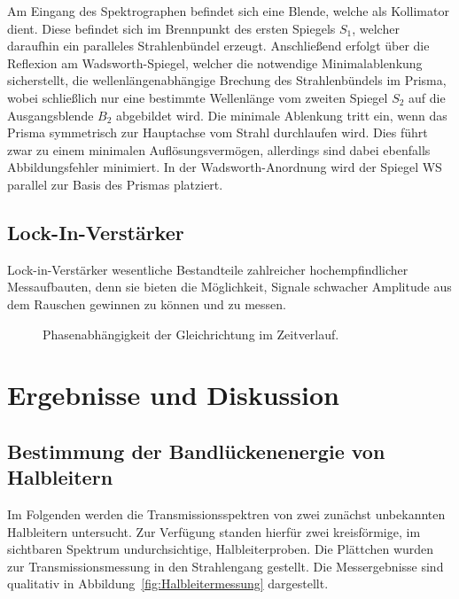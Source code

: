 \documentclass[a4paper,twoside,final]{article}
\begin{document}
Am Eingang des Spektrographen befindet sich eine Blende, welche als Kollimator dient. Diese befindet sich im Brennpunkt des ersten Spiegels $S_1$, welcher daraufhin ein paralleles Strahlenbündel erzeugt. Anschließend erfolgt über die Reflexion am Wadsworth-Spiegel, welcher die notwendige Minimalablenkung sicherstellt, die wellenlängenabhängige Brechung des Strahlenbündels im Prisma, wobei schließlich nur eine bestimmte Wellenlänge vom zweiten Spiegel $S_2$ auf die Ausgangsblende $B_2$ abgebildet wird. Die minimale Ablenkung tritt ein, wenn das Prisma symmetrisch zur Hauptachse vom Strahl durchlaufen wird. Dies führt zwar zu einem minimalen Auflösungsvermögen, allerdings sind dabei ebenfalls Abbildungsfehler minimiert. In der Wadsworth-Anordnung wird der Spiegel WS parallel zur Basis des Prismas platziert.

\subsection{Lock-In-Verstärker}
Lock-in-Verstärker wesentliche Bestandteile zahlreicher hochempfindlicher Messaufbauten, denn sie bieten die Möglichkeit, Signale schwacher Amplitude aus dem Rauschen gewinnen zu können und zu messen.
\begin{figure}[ht]
    \centering
    
    \caption{Phasenabhängigkeit der Gleichrichtung im Zeitverlauf.}
    \label{fig:Gleichrichtung}
\end{figure}

\newpage
\section{Ergebnisse und Diskussion}\label{sec:ErgebnisseUndDiskussion}
% 

\subsection{Bestimmung der Bandlückenenergie von Halbleitern}

Im Folgenden werden die Transmissionsspektren von zwei zunächst unbekannten Halbleitern untersucht. Zur Verfügung standen hierfür zwei kreisförmige, im sichtbaren Spektrum undurchsichtige, Halbleiterproben. Die Plättchen wurden zur Transmissionsmessung in den Strahlengang gestellt. Die Messergebnisse sind qualitativ in Abbildung~\ref{fig:Halbleitermessung} dargestellt.
\end{document}
